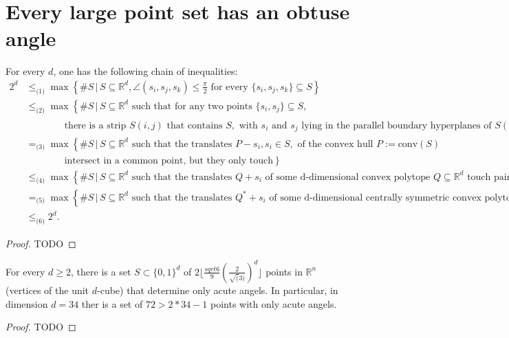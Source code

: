 \chapter{Every large point set has an obtuse angle}

\begin{theorem}
  \label{ch17theorem1}
  For every \(d\), one has the following chain of inequalities:
\begin{align}
    2^d &\leq_{\text{(1)}} \max \left\{ \#S \,|\, S \subseteq \mathbb{R}^d, \angle(s_i, s_j, s_k) \leq \frac{\pi}{2} \text{ for every } \{s_i, s_j, s_k\} \subseteq S \right\} \\
    &\leq_{\text{(2)}} \max \left\{ \#S \,|\, S \subseteq \mathbb{R}^d \text{ such that for any two points } \{s_i, s_j\} \subseteq S, \right. \nonumber \\
    &\qquad\qquad \left. \text{there is a strip } S(i, j) \text{ that contains } S, \text{ with } s_i \text{ and } s_j \text{ lying in the parallel boundary hyperplanes of } S(i, j) \right\} \\
    &=_{\text{(3)}} \max \left\{ \#S \,|\, S \subseteq \mathbb{R}^d \text{ such that the translates } P - s_i, s_i \in S, \text{ of the convex hull } P := \text{conv}(S) \right. \nonumber \\
    &\qquad\qquad \left. \text{intersect in a common point, but they only touch} \right\} \\
    &\leq_{\text{(4)}} \max \left\{ \#S \,|\, S \subseteq \mathbb{R}^d \text{ such that the translates } Q + s_i \text{ of some d-dimensional convex polytope } Q \subseteq \mathbb{R}^d \text{ touch pairwise} \right\} \\
    &=_{\text{(5)}} \max \left\{ \#S \,|\, S \subseteq \mathbb{R}^d \text{ such that the translates } Q^* + s_i \text{ of some d-dimensional centrally symmetric convex polytope } Q^* \subseteq \mathbb{R}^d \text{ touch pairwise} \right\} \\
    &\leq_{\text{(6)}} 2^d.
\end{align}
\end{theorem}
\begin{proof}
  TODO
\end{proof}

\begin{theorem}
  \label{ch17theorem2}
  For every \(d\ge 2\), there is a set \(S\subset\{0, 1\}^d\) of \(2\lfloor\frac{sqrt{6}}{9}(\frac{2}{\sqrt(3)})^d\rfloor\)
  points in \(\mathbb{R}^n\) (vertices of the unit \(d\)-cube) that determine only acute angels.
  In particular, in dimension \(d = 34\) ther is a set of \(72 > 2*34 - 1\) points
  with only acute angels.
\end{theorem}
\begin{proof}
  TODO
\end{proof}
